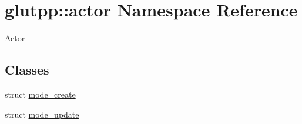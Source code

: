 \hypertarget{namespaceglutpp_1_1actor}{\section{glutpp\-:\-:actor \-Namespace \-Reference}
\label{namespaceglutpp_1_1actor}
}


\-Actor  


\subsection*{\-Classes}
\begin{DoxyCompactItemize}
\item 
struct \hyperlink{structglutpp_1_1actor_1_1mode__create}{mode\-\_\-create}
\item 
struct \hyperlink{structglutpp_1_1actor_1_1mode__update}{mode\-\_\-update}
\end{DoxyCompactItemize}
